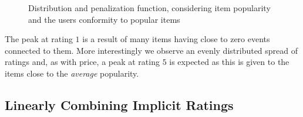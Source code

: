 \begin{figure}[H]
  \begin{subfigure}[b]{0.56\textwidth}
    \centering
  \end{subfigure}
  \begin{subfigure}[b]{0.5\textwidth}
    \centering
  \end{subfigure}
  \caption[Distribution of popularity based ratings]{Distribution and penalization function, considering item popularity
  and the users conformity to popular items}
  \label{fig:dist-popularity}
\end{figure}

The peak at rating $1$ is a result of many items having close to zero events
connected to them. More interestingly we observe an evenly distributed spread
of ratings and, as with price, a peak at rating $5$ is expected as this is
given to the items close to the \textit{average} popularity.

\subsection{Linearly Combining Implicit Ratings}

